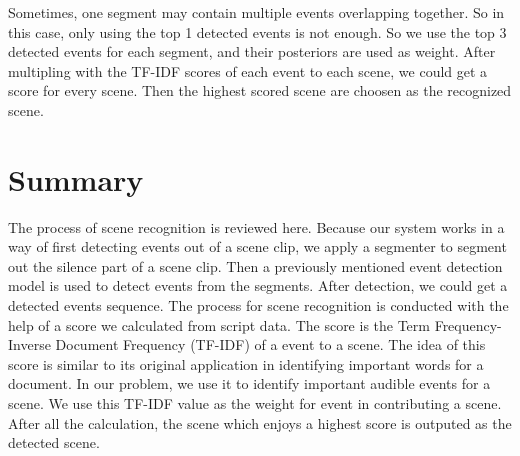 Sometimes, one segment may contain multiple events overlapping together. 
So in this case, only using the top 1 detected events is not enough. 
So we use the top 3 detected events for each segment, and their posteriors are used as weight. 
After multipling with the TF-IDF scores of each event to each scene, we could get a score for every scene. 
Then the highest scored scene are choosen as the recognized scene. 

\section{Summary}
The process of scene recognition is reviewed here. 
Because our system works in a way of first detecting events out of a scene clip, we apply a segmenter to segment out the silence part of a scene clip. 
Then a previously mentioned event detection model is used to detect events from the segments. 
After detection, we could get a detected events sequence. 
The process for scene recognition is conducted with the help of a score we calculated from script data. 
The score is the Term Frequency-Inverse Document Frequency (TF-IDF) of a event to a scene. 
The idea of this score is similar to its original application in identifying important words for a document. 
In our problem, we use it to identify important audible events for a scene. 
We use this TF-IDF value as the weight for event in contributing a scene. 
After all the calculation, the scene which enjoys a highest score is outputed as the detected scene. 
